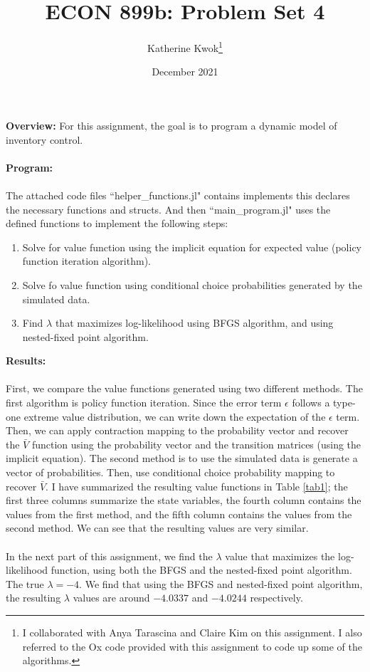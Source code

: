 \documentclass[12pt]{article}
\title{ECON 899b: Problem Set 4}
\author{Katherine Kwok\footnote{I collaborated with Anya Tarascina and Claire Kim on this assignment. I also referred to the Ox code provided with this assignment to code up some of the algorithms.}}
\date{December 2021}
\begin{document}
\maketitle
\noindent \textbf{Overview:} For this assignment, the goal is to program a dynamic model of inventory control.\\\\
\noindent \textbf{Program:} \\\\
The attached code files ``helper\_functions.jl" contains implements this declares the necessary functions and structs. And then ``main\_program.jl" uses the defined functions to implement the following steps:
\begin{enumerate}
	\item Solve for value function using the implicit equation for expected value (policy function iteration algorithm).
	\item Solve fo value function using conditional choice probabilities generated by the simulated data.
	\item Find $\lambda$ that maximizes log-likelihood using BFGS algorithm, and using nested-fixed point algorithm.
\end{enumerate}
\noindent \textbf{Results:} \\\\
First, we compare the value functions generated using two different methods. The first algorithm is policy function iteration. Since the error term $\epsilon$ follows a type-one extreme value distribution, we can write down the expectation of the $\epsilon$ term. Then, we can  apply contraction mapping to the probability vector and recover the $\bar{V}$ function using the probability vector and the transition matrices (using the implicit equation). The second method is to use the simulated data is generate a vector of probabilities. Then, use conditional choice probability mapping to recover $\bar{V}$. I have summarized the resulting value functions in Table \ref{tab1}; the first three columns summarize the state variables, the fourth column contains the values from the first method, and the fifth column contains the values from the second method. We can see that the resulting values are very similar. \\\\
In the next part of this assignment, we find the $\lambda$ value that maximizes the log-likelihood function, using both the BFGS and the nested-fixed point algorithm. The true $\lambda = -4$. We find that using the BFGS and nested-fixed point algorithm, the resulting $\lambda$ values are around $-4.0337$ and $-4.0244$ respectively.


\end{document}

